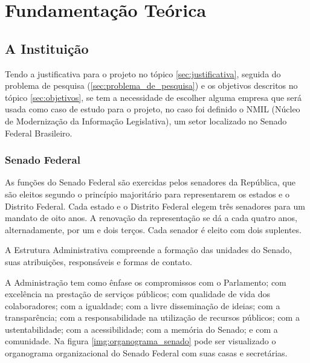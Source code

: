 \chapter[Fundamentação Teórica]{Fundamentação Teórica}
\label{cp:fundamentacao}



\section{A Instituição}

Tendo a justificativa para o projeto no tópico \ref{sec:justificativa}, seguida do problema de pesquisa (\ref{sec:problema_de_pesquisa}) e os objetivos descritos no tópico \ref{sec:objetivos}, se tem a necessidade de escolher alguma empresa que será usada como caso de estudo para o projeto, no caso foi definido o NMIL (Núcleo de Modernização da Informação Legislativa), um setor localizado no Senado Federal Brasileiro.

\subsection{Senado Federal}

As funções do Senado Federal são exercidas pelos senadores da República, que são eleitos segundo o princípio majoritário para representarem os estados e o Distrito Federal. Cada estado e o Distrito Federal elegem três senadores para um mandato de oito anos. A renovação da representação se dá a cada quatro anos, alternadamente, por um e dois terços. Cada senador é eleito com dois suplentes.

A Estrutura Administrativa compreende a formação das unidades do Senado, suas
atribuições, responsáveis e formas de contato.

A Administração tem como ênfase os compromissos com o Parlamento; com excelência na prestação de serviços públicos; com qualidade de vida dos colaboradores; com a igualdade; com a livre disseminação de ideias; com a transparência; com a responsabilidade na utilização
de recursos públicos; com a ustentabilidade; com a acessibilidade; com a memória do Senado; e com a comunidade. Na figura \ref{img:organograma_senado} pode ser visualizado o organograma organizacional do Senado Federal com suas casas e secretárias.

